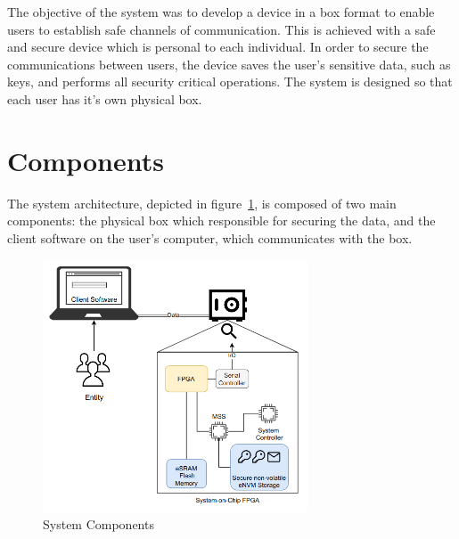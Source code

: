 \cleardoublepage
\label{chap:arch}

The objective of the system was to develop a device in a box format to enable users to establish safe channels of communication. This is achieved with a safe and secure device which is personal to each individual. In order to secure the communications between users, the device saves the user's sensitive data, such as keys, and performs all security critical operations.
The system is designed so that each user has it's own physical box.

\section{Components}\label{chap:arch:components}

The system architecture, depicted in figure~\ref{fig:components}, is composed of two main components: the physical box which responsible for securing the data, and the client software on the user's computer, which communicates with the box.

\begin{figure}[h]
    \centering
    \includegraphics[width=0.7\textwidth]{./Images/main-components.png}
    \caption{System Components}
    \label{fig:components}
\end{figure}

